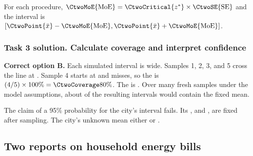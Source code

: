 For each procedure, $\CtwoMoE{\mathrm{MoE}}=\CtwoCritical{z^*}\times\CtwoSE{\mathrm{SE}}$ and the interval is $[\CtwoPoint{\bar{x}}-\CtwoMoE{\mathrm{MoE}},\CtwoPoint{\bar{x}}+\CtwoMoE{\mathrm{MoE}}]$.


\par\vspace{3mm}


\noindent\begin{minipage}{\linewidth}
\subsubsection*{Task 3 solution. Calculate coverage and interpret confidence}
\label{sol:c2-1-c}

\textbf{Correct option B.} Each simulated interval is  wide. Samples 1, 2, 3, and 5 cross the line at . Sample 4 starts at  and misses, so the  is $(4/5)\times100\%=\CtwoCoverage{80\%}$. The  is . Over many fresh samples under the model assumptions, about  of the resulting intervals would contain the fixed mean.

The claim of a 95\% probability for the city's interval fails. Its ,  and , are fixed after sampling. The city's unknown mean either  or .

\par\vspace{3mm}
\end{minipage}\par

\clearpage

\subsection{Two reports on household energy bills}
\label{prob:c2-2}

